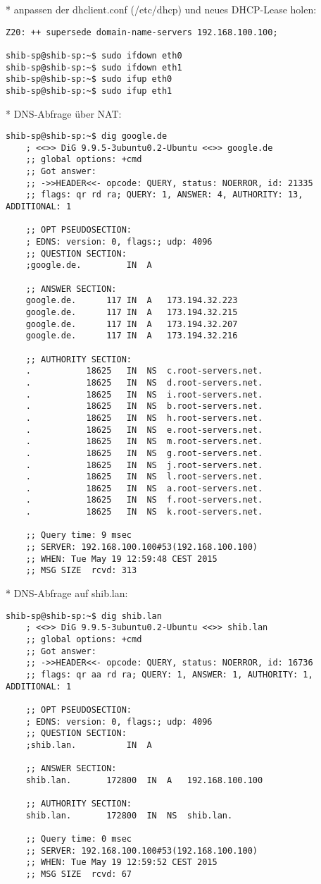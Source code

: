 * anpassen der dhclient.conf (/etc/dhcp) und neues DHCP-Lease holen:
\begin{lstlisting}
Z20: ++ supersede domain-name-servers 192.168.100.100;

shib-sp@shib-sp:~$ sudo ifdown eth0
shib-sp@shib-sp:~$ sudo ifdown eth1
shib-sp@shib-sp:~$ sudo ifup eth0
shib-sp@shib-sp:~$ sudo ifup eth1
\end{lstlisting}
* DNS-Abfrage über NAT:
\begin{lstlisting}
shib-sp@shib-sp:~$ dig google.de
	; <<>> DiG 9.9.5-3ubuntu0.2-Ubuntu <<>> google.de
	;; global options: +cmd
	;; Got answer:
	;; ->>HEADER<<- opcode: QUERY, status: NOERROR, id: 21335
	;; flags: qr rd ra; QUERY: 1, ANSWER: 4, AUTHORITY: 13, ADDITIONAL: 1

	;; OPT PSEUDOSECTION:
	; EDNS: version: 0, flags:; udp: 4096
	;; QUESTION SECTION:
	;google.de.			IN	A

	;; ANSWER SECTION:
	google.de.		117	IN	A	173.194.32.223
	google.de.		117	IN	A	173.194.32.215
	google.de.		117	IN	A	173.194.32.207
	google.de.		117	IN	A	173.194.32.216

	;; AUTHORITY SECTION:
	.			18625	IN	NS	c.root-servers.net.
	.			18625	IN	NS	d.root-servers.net.
	.			18625	IN	NS	i.root-servers.net.
	.			18625	IN	NS	b.root-servers.net.
	.			18625	IN	NS	h.root-servers.net.
	.			18625	IN	NS	e.root-servers.net.
	.			18625	IN	NS	m.root-servers.net.
	.			18625	IN	NS	g.root-servers.net.
	.			18625	IN	NS	j.root-servers.net.
	.			18625	IN	NS	l.root-servers.net.
	.			18625	IN	NS	a.root-servers.net.
	.			18625	IN	NS	f.root-servers.net.
	.			18625	IN	NS	k.root-servers.net.

	;; Query time: 9 msec
	;; SERVER: 192.168.100.100#53(192.168.100.100)
	;; WHEN: Tue May 19 12:59:48 CEST 2015
	;; MSG SIZE  rcvd: 313
\end{lstlisting}
* DNS-Abfrage auf shib.lan:
\begin{lstlisting}
shib-sp@shib-sp:~$ dig shib.lan
	; <<>> DiG 9.9.5-3ubuntu0.2-Ubuntu <<>> shib.lan
	;; global options: +cmd
	;; Got answer:
	;; ->>HEADER<<- opcode: QUERY, status: NOERROR, id: 16736
	;; flags: qr aa rd ra; QUERY: 1, ANSWER: 1, AUTHORITY: 1, ADDITIONAL: 1

	;; OPT PSEUDOSECTION:
	; EDNS: version: 0, flags:; udp: 4096
	;; QUESTION SECTION:
	;shib.lan.			IN	A

	;; ANSWER SECTION:
	shib.lan.		172800	IN	A	192.168.100.100

	;; AUTHORITY SECTION:
	shib.lan.		172800	IN	NS	shib.lan.

	;; Query time: 0 msec
	;; SERVER: 192.168.100.100#53(192.168.100.100)
	;; WHEN: Tue May 19 12:59:52 CEST 2015
	;; MSG SIZE  rcvd: 67
\end{lstlisting}
